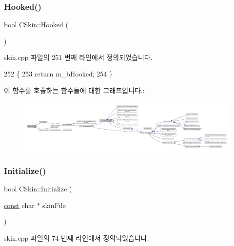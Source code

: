 \subsubsection{\texorpdfstring{Hooked()}{Hooked()}}
{\footnotesize\ttfamily bool C\+Skin\+::\+Hooked (\begin{DoxyParamCaption}{ }\end{DoxyParamCaption})}



skin.\+cpp 파일의 251 번째 라인에서 정의되었습니다.


\begin{DoxyCode}
252 \{
253   \textcolor{keywordflow}{return} m\_bHooked;
254 \}
\end{DoxyCode}
이 함수를 호출하는 함수들에 대한 그래프입니다.\+:
\nopagebreak
\begin{figure}[H]
\begin{center}
\leavevmode
\includegraphics[width=350pt]{class_c_skin_a99b438d858bbafa83569f19e707ba3c9_icgraph}
\end{center}
\end{figure}
\mbox{\label{class_c_skin_ac9b8048b8c4a853574cc4c0f8b29827d}} 
\subsubsection{\texorpdfstring{Initialize()}{Initialize()}}
{\footnotesize\ttfamily bool C\+Skin\+::\+Initialize (\begin{DoxyParamCaption}\item[{\mbox{\hyperlink{getopt1_8c_a2c212835823e3c54a8ab6d95c652660e}{const}} char $\ast$}]{skin\+File }\end{DoxyParamCaption})}



skin.\+cpp 파일의 74 번째 라인에서 정의되었습니다.


